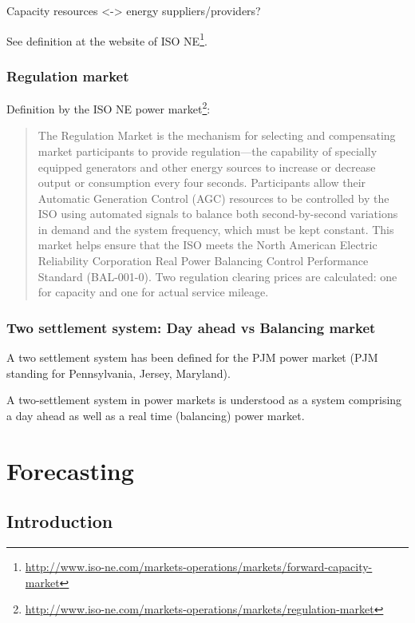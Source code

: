 Capacity resources <-> energy suppliers/providers?

See definition at the website of ISO NE\footnote{\url{http://www.iso-ne.com/markets-operations/markets/forward-capacity-market}}.

\subsubsection{Regulation market}

Definition by the ISO NE power market\footnote{\url{http://www.iso-ne.com/markets-operations/markets/regulation-market}}:

\begin{quote}
The Regulation Market is the mechanism for selecting and compensating market participants to provide regulation—the capability of specially equipped generators and other energy sources to increase or decrease output or consumption every four seconds. Participants allow their Automatic Generation Control (AGC) resources to be controlled by the ISO using automated signals to balance both second-by-second variations in demand and the system frequency, which must be kept constant. This market helps ensure that the ISO meets the North American Electric Reliability Corporation Real Power Balancing Control Performance Standard (BAL-001-0). Two regulation clearing prices are calculated: one for capacity and one for actual service mileage.
\end{quote}




\subsubsection{Two settlement system: Day ahead vs Balancing market}

A two settlement system has been defined for the PJM power market (PJM standing for Pennsylvania, Jersey, Maryland)\cite{lambert2001creating}. 

A two-settlement system in power markets is understood as a system comprising a day ahead as well as a real time (balancing) power market\cite{lambert2001creating}. 




\section{Forecasting}

\subsection{Introduction}


